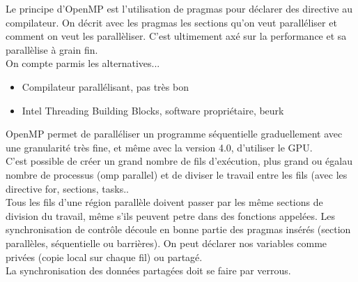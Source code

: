 \documentclass[oneside]{book}
\begin{document}
Le principe d'OpenMP est l'utilisation de pragmas pour déclarer des directive au compilateur. On décrit avec les pragmas les sections qu'on veut paralléliser et comment on veut les parallèliser. C'est ultimement axé sur la performance et sa parallèlise à grain fin.\\

On compte parmis les alternatives...
\begin{itemize}
\item Compilateur parallélisant, pas très bon
\item Intel Threading Building Blocks, software propriétaire, beurk
\end{itemize}

OpenMP permet de paralléliser un programme séquentielle graduellement avec une granularité très fine, et même avec la version 4.0, d'utiliser le GPU.\\

C'est possible de créer un grand nombre de fils d'exécution, plus grand ou égalau nombre de processus (omp parallel) et de diviser le travail entre les fils (avec les directive for, sections, tasks..\\

Tous les fils d'une région parallèle doivent passer par les même sections de division du travail, même s'ils peuvent petre dans des fonctions appelées. Les synchronisation de contrôle découle en bonne partie des pragmas insérés (section parallèles, séquentielle ou barrières). On peut déclarer nos variables comme privées (copie local sur chaque fil) ou partagé.\\

La synchronisation des données partagées doit se faire par verrous.
\end{document}
